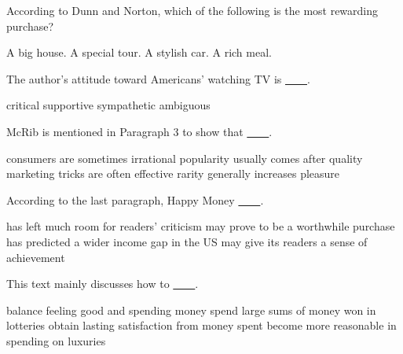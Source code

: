 \item According to Dunn and Norton, which of the following is the most rewarding purchase?
\begin{tasks}
	\task A big house.
	\task A special tour.
	\task A stylish car.
	\task A rich meal.
\end{tasks}
\item The author's attitude toward Americans' watching TV is \uline{~~~~}.
\begin{tasks}
	\task critical
	\task supportive
	\task sympathetic
	\task ambiguous
\end{tasks}
\item McRib is mentioned in Paragraph 3 to show that \uline{~~~~}.
\begin{tasks}
	\task consumers are sometimes irrational
	\task popularity usually comes after quality
	\task marketing tricks are often effective
	\task rarity generally increases pleasure
\end{tasks}
\item According to the last paragraph, Happy Money \uline{~~~~}.
\begin{tasks}
	\task has left much room for readers' criticism
	\task may prove to be a worthwhile purchase
	\task has predicted a wider income gap in the US
	\task may give its readers a sense of achievement
\end{tasks}
\item This text mainly discusses how to \uline{~~~~}.
\begin{tasks}
	\task balance feeling good and spending money
	\task spend large sums of money won in lotteries
	\task obtain lasting satisfaction from money spent
	\task become more reasonable in spending on luxuries
\end{tasks}